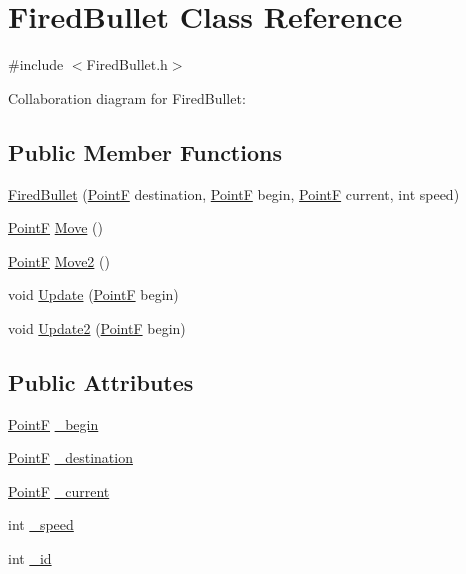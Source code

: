 \hypertarget{class_fired_bullet}{}\section{Fired\+Bullet Class Reference}
\label{class_fired_bullet}


{\ttfamily \#include $<$Fired\+Bullet.\+h$>$}



Collaboration diagram for Fired\+Bullet\+:
\subsection*{Public Member Functions}
\begin{DoxyCompactItemize}
\item 
\hyperlink{class_fired_bullet_a529de1e268d0b6c42250b9990d5b78d0}{Fired\+Bullet} (\hyperlink{drawtools_8h_adc4a66bcb59b74164130ed47cb387ec3}{PointF} destination, \hyperlink{drawtools_8h_adc4a66bcb59b74164130ed47cb387ec3}{PointF} begin, \hyperlink{drawtools_8h_adc4a66bcb59b74164130ed47cb387ec3}{PointF} current, int speed)
\item 
\hyperlink{drawtools_8h_adc4a66bcb59b74164130ed47cb387ec3}{PointF} \hyperlink{class_fired_bullet_ad539d4400ec29a8d5acf32894c14c343}{Move} ()
\item 
\hyperlink{drawtools_8h_adc4a66bcb59b74164130ed47cb387ec3}{PointF} \hyperlink{class_fired_bullet_a23c23a8751529c4a6b65cb3834590c4a}{Move2} ()
\item 
void \hyperlink{class_fired_bullet_a2bd7ebc645c7db940bf3c97d57f25267}{Update} (\hyperlink{drawtools_8h_adc4a66bcb59b74164130ed47cb387ec3}{PointF} begin)
\item 
void \hyperlink{class_fired_bullet_a6517ef78bdc537d556083c093ad6ba91}{Update2} (\hyperlink{drawtools_8h_adc4a66bcb59b74164130ed47cb387ec3}{PointF} begin)
\end{DoxyCompactItemize}
\subsection*{Public Attributes}
\begin{DoxyCompactItemize}
\item 
\hyperlink{drawtools_8h_adc4a66bcb59b74164130ed47cb387ec3}{PointF} \hyperlink{class_fired_bullet_ad375a79880642a62919962703d517647}{\+\_\+begin}
\item 
\hyperlink{drawtools_8h_adc4a66bcb59b74164130ed47cb387ec3}{PointF} \hyperlink{class_fired_bullet_a288c5a49e15534f75c3ec5fde81dfa28}{\+\_\+destination}
\item 
\hyperlink{drawtools_8h_adc4a66bcb59b74164130ed47cb387ec3}{PointF} \hyperlink{class_fired_bullet_a6dd6875fc874a58132ecd2972c382889}{\+\_\+current}
\item 
int \hyperlink{class_fired_bullet_a740fdbda74e1c585cc1771d56d2a9807}{\+\_\+speed}
\item 
int \hyperlink{class_fired_bullet_aec3fb0f356070b8dfa295b771f8afb2e}{\+\_\+id}
\end{DoxyCompactItemize}


